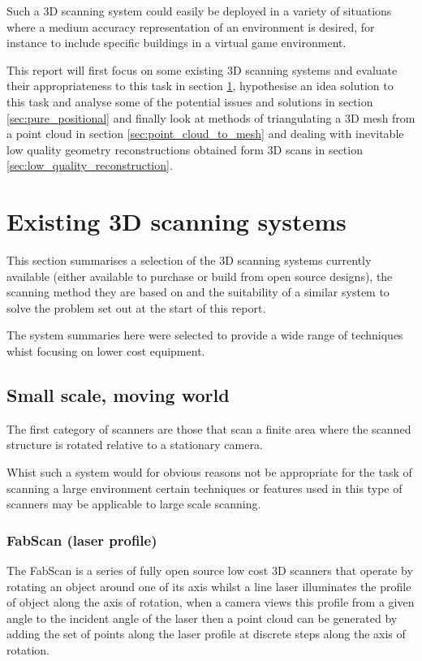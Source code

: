 \documentclass{entcs}
\begin{document}
Such a 3D scanning system could easily be deployed in a variety of situations
where a medium accuracy representation of an environment is desired, for
instance to include specific buildings in a virtual game environment.

This report will first focus on some existing 3D scanning systems and evaluate
their appropriateness to this task in section \ref{sec:existing}, hypothesise an
idea solution to this task and analyse some of the potential issues and
solutions in section \ref{sec:pure_positional} and finally look at methods of
triangulating a 3D mesh from a point cloud in section
\ref{sec:point_cloud_to_mesh} and dealing with inevitable low quality geometry
reconstructions obtained form 3D scans in section
\ref{sec:low_quality_reconstruction}.

\section{Existing 3D scanning systems}
\label{sec:existing}

This section summarises a selection of the 3D scanning systems currently
available (either available to purchase or build from open source designs), the
scanning method they are based on and the suitability of a similar system to
solve the problem set out at the start of this report.

The system summaries here were selected to provide a wide range of techniques
whist focusing on lower cost equipment.

\subsection{Small scale, moving world}

The first category of scanners are those that scan a finite area where the
scanned structure is rotated relative to a stationary camera.

Whist such a system would for obvious reasons not be appropriate for the task of
scanning a large environment certain techniques or features used in this type of
scanners may be applicable to large scale scanning.

\subsubsection{FabScan (laser profile)}

The FabScan \cite{Engelmann2011} is a series of fully open source low cost 3D
scanners that operate by rotating an object around one of its axis whilst a line
laser illuminates the profile of object along the axis of rotation, when a
camera views this profile from a given angle to the incident angle of the laser
then a point cloud can be generated by adding the set of points along the laser
profile at discrete steps along the axis of rotation.
\end{document}
